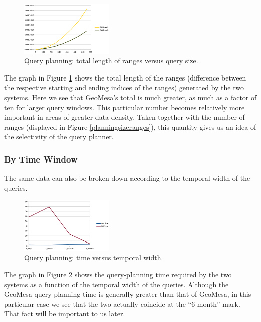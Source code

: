 \begin{figure}[h!tb]
  \centering
  \includegraphics[width=0.40\textwidth]{../docs/img/query-planning/size-length.png}
  \caption{Query planning: total length of ranges versus query size.}
  \label{planningsizelength}
\end{figure}

The graph in Figure \ref{planningsizelength} shows the total length of the ranges (difference between the respective starting and ending indices of the ranges) generated by the two systems.
Here we see that GeoMesa's total is much greater, as much as a factor of ten for larger query windows.
This particular number becomes relatively more important in areas of greater data density.
Taken together with the number of ranges (displayed in Figure \ref{planningsizeranges}), this quantity gives us an idea of the selectivity of the query planner.

\subsubsection{By Time Window}

The same data can also be broken-down according to the temporal width of the queries.

\begin{figure}[h!tb]
  \centering
  \includegraphics[width=0.40\textwidth]{../docs/img/query-planning/window-times.png}
  \caption{Query planning: time versus temporal width.}
  \label{planningtimetime}
\end{figure}

The graph in Figure \ref{planningtimetime} shows the query-planning time required by the two systems as a function of the temporal width of the queries.
Although the GeoMesa query-planning time is generally greater than that of GeoMesa, in this particular case we see that the two actually coincide at the ``$6$ month'' mark.
That fact will be important to us later.

